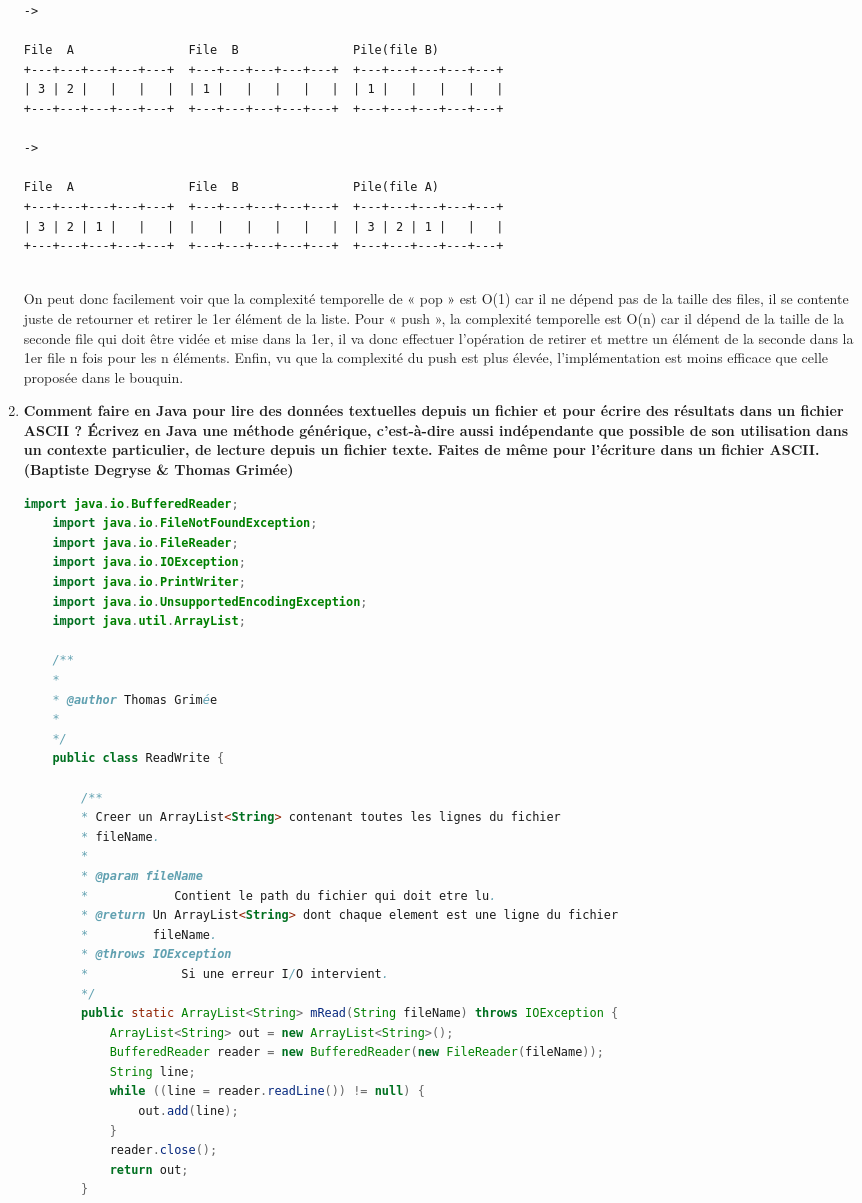 \documentclass[a4paper]{article}
\begin{document}
\begin{enumerate}
\begin{verbatim}
-> 

File  A                File  B                Pile(file B)
+---+---+---+---+---+  +---+---+---+---+---+  +---+---+---+---+---+
| 3 | 2 |   |   |   |  | 1 |   |   |   |   |  | 1 |   |   |   |   |
+---+---+---+---+---+  +---+---+---+---+---+  +---+---+---+---+---+

-> 

File  A                File  B                Pile(file A)
+---+---+---+---+---+  +---+---+---+---+---+  +---+---+---+---+---+
| 3 | 2 | 1 |   |   |  |   |   |   |   |   |  | 3 | 2 | 1 |   |   |
+---+---+---+---+---+  +---+---+---+---+---+  +---+---+---+---+---+
		
\end{verbatim}	
		
On peut donc facilement voir que la complexité temporelle de « pop » est O(1) car il ne dépend pas de la taille des files, il se contente juste de retourner et retirer le 1er élément de la liste. Pour « push », la complexité temporelle est O(n) car il dépend de la taille de la seconde file qui doit être vidée et mise dans la 1er, il va donc effectuer l’opération de retirer et mettre un élément de la seconde dans la 1er file n fois pour les n éléments.
Enfin, vu que la complexité du push est plus élevée, l'implémentation est moins efficace que celle proposée dans le bouquin.
		
		
		\newpage
		\item\textbf{Comment faire en Java pour lire des données textuelles depuis un fichier et pour
			écrire des résultats dans un fichier ASCII ? Écrivez en Java une méthode générique,
			c’est-à-dire aussi indépendante que possible de son utilisation dans un
			contexte particulier, de lecture depuis un fichier texte. Faites de même pour l’écriture
			dans un fichier ASCII. (Baptiste Degryse \& Thomas Grimée)}
				
\begin{lstlisting}[language=Java]
	import java.io.BufferedReader;
	import java.io.FileNotFoundException;
	import java.io.FileReader;
	import java.io.IOException;
	import java.io.PrintWriter;
	import java.io.UnsupportedEncodingException;
	import java.util.ArrayList;
	
	/**
	* 
	* @author Thomas Grimée
	* 
	*/
	public class ReadWrite {
	
		/**
		* Creer un ArrayList<String> contenant toutes les lignes du fichier
		* fileName.
		* 
		* @param fileName
		*            Contient le path du fichier qui doit etre lu.
		* @return Un ArrayList<String> dont chaque element est une ligne du fichier
		*         fileName.
		* @throws IOException
		*             Si une erreur I/O intervient.
		*/
		public static ArrayList<String> mRead(String fileName) throws IOException {
			ArrayList<String> out = new ArrayList<String>();
			BufferedReader reader = new BufferedReader(new FileReader(fileName));
			String line;
			while ((line = reader.readLine()) != null) {
				out.add(line);
			}
			reader.close();
			return out;
		}
		

\end{lstlisting}
\end{enumerate}
\end{document}
